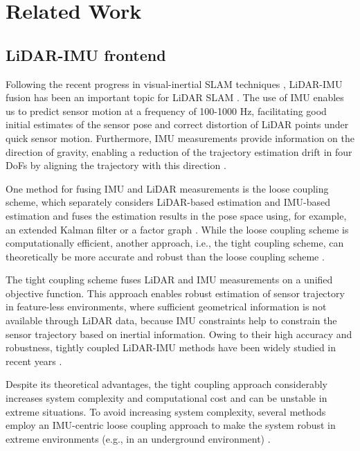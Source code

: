 \documentclass[letterpaper, 10 pt, conference]{ieeeconf}  %
\begin{document}
\section{Related Work}

\subsection{LiDAR-IMU frontend}

Following the recent progress in visual-inertial SLAM techniques \cite{Qin2018,Stumberg2018,Campos2021}, LiDAR-IMU fusion has been an important topic for LiDAR SLAM \cite{liosam2020shan}. The use of IMU enables us to predict sensor motion at a frequency of 100-1000 Hz, facilitating good initial estimates of the sensor pose and correct distortion of LiDAR points under quick sensor motion. Furthermore, IMU measurements provide information on the direction of gravity, enabling a reduction of the trajectory estimation drift in four DoFs by aligning the trajectory with this direction \cite{Qin2018}.

One method for fusing IMU and LiDAR measurements is the loose coupling scheme, which separately considers LiDAR-based estimation and IMU-based estimation and fuses the estimation results in the pose space using, for example, an extended Kalman filter \cite{Weiss2011} or a factor graph \cite{liosam2020shan,Indelman2013}. While the loose coupling scheme is computationally efficient, another approach, i.e., the tight coupling scheme, can theoretically be more accurate and robust than the loose coupling scheme \cite{Ye2019}. 

The tight coupling scheme fuses LiDAR and IMU measurements on a unified objective function. This approach enables robust estimation of sensor trajectory in feature-less environments, where sufficient geometrical information is not available through LiDAR data, because IMU constraints help to constrain the sensor trajectory based on inertial information. Owing to their high accuracy and robustness, tightly coupled LiDAR-IMU methods have been widely studied in recent years \cite{Ye2019,Qin2020,Xu2021,Li2021}. 

Despite its theoretical advantages, the tight coupling approach considerably increases system complexity and computational cost and can be unstable in extreme situations. To avoid increasing system complexity, several methods employ an IMU-centric loose coupling approach to make the system robust in extreme environments (e.g., in an underground environment) \cite{Palieri2021,zhao2021super}.
\end{document}
